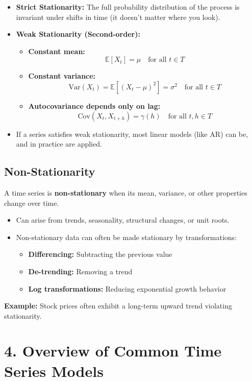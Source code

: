 \documentclass[10pt]{article}
\begin{document}
\begin{itemize}
	\item \textbf{Strict Stationarity:} The full probability distribution of the process is invariant under shifts in time (it doesn't matter where you look).
	\item \textbf{Weak Stationarity (Second-order):}
	\begin{itemize}
		\item \textbf{Constant mean:} 
		\[
		\mathbb{E}[X_t] = \mu \quad \text{for all } t \in T
		\]
		
		\item \textbf{Constant variance:} 
		\[
		\text{Var}(X_t) = \mathbb{E}[(X_t - \mu)^2] = \sigma^2 \quad \text{for all } t \in T
		\]
		
		\item \textbf{Autocovariance depends only on lag:} 
		\[
		\text{Cov}(X_t, X_{t+h}) = \gamma(h) \quad \text{for all } t, h \in T
		\]
	\end{itemize}
	\item If a series satisfies weak stationarity, most linear models (like AR) can be, and in practice are applied.
\end{itemize}
\subsection*{Non-Stationarity}
A time series is \textbf{non-stationary} when its mean, variance, or other properties change over time.

\begin{itemize}
	\item Can arise from trends, seasonality, structural changes, or unit roots.
	\item Non-stationary data can often be made stationary by transformations:
	\begin{itemize}
		\item \textbf{Differencing:} Subtracting the previous value 
		\item \textbf{De-trending:} Removing a trend
		\item \textbf{Log transformations:} Reducing exponential growth behavior
	\end{itemize}
\end{itemize}

\textbf{Example:} Stock prices often exhibit a long-term upward trend violating stationarity.

\section*{4. Overview of Common Time Series Models}
\end{document}
